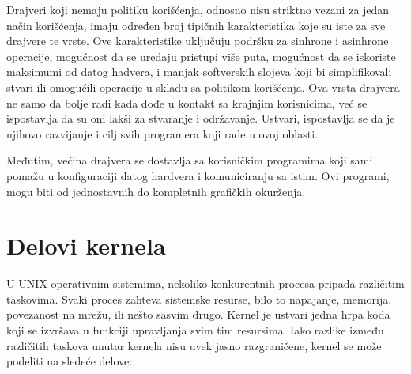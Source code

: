 \documentclass[a4paper, 12pt, diplomski]{etf}
\begin{document}
	Drajveri koji nemaju politiku korišćenja, odnosno nisu striktno vezani za jedan način korišćenja, imaju određen broj tipičnih karakteristika koje su iste za sve drajvere te vrste. Ove karakteristike uključuju podršku za sinhrone i asinhrone operacije, mogućnost da se uređaju pristupi više puta, mogućnost da se iskoriste maksimumi od datog hadvera, i manjak softverskih slojeva koji bi simplifikovali stvari ili omogućili operacije u skladu sa politikom korišćenja. Ova vrsta drajvera ne samo da bolje radi kada dođe u kontakt sa krajnjim korisnicima, već se ispostavlja da su oni lakši za stvaranje i održavanje. Ustvari, ispostavlja se da je njihovo razvijanje i cilj svih programera koji rade u ovoj oblasti.

	Međutim, većina drajvera se dostavlja sa korisničkim programima koji sami pomažu u konfiguraciji datog hardvera i komuniciranju sa istim. Ovi programi, mogu biti od jednostavnih do kompletnih grafičkih okurženja.

	\section{Delovi kernela}

	U UNIX operativnim sistemima, nekoliko konkurentnih procesa pripada različitim taskovima. Svaki proces zahteva sistemske resurse, bilo to napajanje, memorija, povezanost na mrežu, ili nešto sasvim drugo. Kernel je ustvari jedna hrpa koda koji se izvršava u funkciji upravljanja svim tim resursima. Iako razlike između različitih taskova unutar kernela nisu uvek jasno razgraničene, kernel se može podeliti na sledeće delove:
\end{document}
